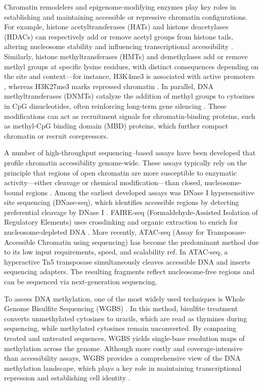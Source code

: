 \begin{dissertationintroduction}
    Chromatin remodelers and epigenome-modifying enzymes play key roles in establishing and maintaining accessible or repressive chromatin configurations. For example, histone acetyltransferases (HATs) and histone deacetylases (HDACs) can respectively add or remove acetyl groups from histone tails, altering nucleosome stability and influencing transcriptional accessibility {}. Similarly, histone methyltransferases (HMTs) and demethylases add or remove methyl groups at specific lysine residues, with distinct consequences depending on the site and context—for instance, H3K4me3 is associated with active promoters {}, whereas H3K27me3 marks repressed chromatin {}. In parallel, DNA methyltransferases (DNMTs) catalyze the addition of methyl groups to cytosines in CpG dinucleotides, often reinforcing long-term gene silencing {}. These modifications can act as recruitment signals for chromatin-binding proteins, such as methyl-CpG binding domain (MBD) proteins, which further compact chromatin or recruit corepressors.

    A number of high-throughput sequencing–based assays have been developed that profile chromatin accessibility genome-wide. These assays typically rely on the principle that regions of open chromatin are more susceptible to enzymatic activity—either cleavage or chemical modification—than closed, nucleosome-bound regions {}. Among the earliest developed assays was DNase I hypersensitive site sequencing (DNase-seq), which identifies accessible regions by detecting preferential cleavage by DNase I {}. FAIRE-seq (Formaldehyde-Assisted Isolation of Regulatory Elements) uses crosslinking and organic extraction to enrich for nucleosome-depleted DNA {}. More recently, ATAC-seq (Assay for Transposase-Accessible Chromatin using sequencing) has become the predominant method due to its low input requirements, speed, and scalability {ref}. In ATAC-seq, a hyperactive Tn5 transposase simultaneously cleaves accessible DNA and inserts sequencing adapters. The resulting fragments reflect nucleosome-free regions and can be sequenced via next-generation sequencing.

    To assess DNA methylation, one of the most widely used techniques is Whole Genome Bisulfite Sequencing (WGBS) {}. In this method, bisulfite treatment converts unmethylated cytosines to uracils, which are read as thymines during sequencing, while methylated cytosines remain unconverted. By comparing treated and untreated sequences, WGBS yields single-base resolution maps of methylation across the genome. Although more costly and coverage-intensive than accessibility assays, WGBS provides a comprehensive view of the DNA methylation landscape, which plays a key role in maintaining transcriptional repression and establishing cell identity {}.


\end{dissertationintroduction}
